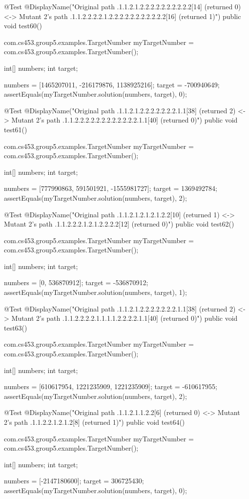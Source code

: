 @Test
@DisplayName("Original path .1.1.2.1.2.2.2.2.2.2.2.2.2.2[14] (returned 0) <-> Mutant 2's path .1.1.2.2.2.2.1.2.2.2.2.2.2.2.2.2.2.2[16] (returned 1)")
public void test60() {
    com.cs453.group5.examples.TargetNumber myTargetNumber = com.cs453.group5.examples.TargetNumber();

    int[] numbers;
    int target;

    numbers = [1465207011, -216179876, 1138925216];
    target = -700940649;
    assertEquals(myTargetNumber.solution(numbers, target), 0);
}

@Test
@DisplayName("Original path .1.1.2.1.2.2.2.2.2.2.2.1.1[38] (returned 2) <-> Mutant 2's path .1.1.2.2.2.2.2.2.2.2.2.2.2.2.1.1[40] (returned 0)")
public void test61() {
    com.cs453.group5.examples.TargetNumber myTargetNumber = com.cs453.group5.examples.TargetNumber();

    int[] numbers;
    int target;

    numbers = [777990863, 591501921, -1555981727];
    target = 1369492784;
    assertEquals(myTargetNumber.solution(numbers, target), 2);
}

@Test
@DisplayName("Original path .1.1.2.1.2.1.2.1.2.2[10] (returned 1) <-> Mutant 2's path .1.1.2.2.2.1.2.1.2.2.2.2[12] (returned 0)")
public void test62() {
    com.cs453.group5.examples.TargetNumber myTargetNumber = com.cs453.group5.examples.TargetNumber();

    int[] numbers;
    int target;

    numbers = [0, 536870912];
    target = -536870912;
    assertEquals(myTargetNumber.solution(numbers, target), 1);
}

@Test
@DisplayName("Original path .1.1.2.1.2.2.2.2.2.2.2.1.1[38] (returned 2) <-> Mutant 2's path .1.1.2.2.2.2.1.1.1.1.2.2.2.2.1.1[40] (returned 0)")
public void test63() {
    com.cs453.group5.examples.TargetNumber myTargetNumber = com.cs453.group5.examples.TargetNumber();

    int[] numbers;
    int target;

    numbers = [610617954, 1221235909, 1221235909];
    target = -610617955;
    assertEquals(myTargetNumber.solution(numbers, target), 2);
}

@Test
@DisplayName("Original path .1.1.2.1.1.2.2[6] (returned 0) <-> Mutant 2's path .1.1.2.2.1.2.1.2[8] (returned 1)")
public void test64() {
    com.cs453.group5.examples.TargetNumber myTargetNumber = com.cs453.group5.examples.TargetNumber();

    int[] numbers;
    int target;

    numbers = [-2147180600];
    target = 306725430;
    assertEquals(myTargetNumber.solution(numbers, target), 0);
}

